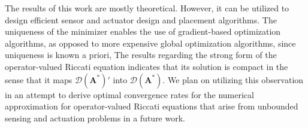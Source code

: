 \documentclass{amsart}
\newcommand{\bA}{\mathbf A}
\begin{document}
The results of this work are mostly theoretical. However, it can be utilized to design efficient sensor and actuator design and placement algorithms. The uniqueness of the minimizer enables the use of gradient-based optimization algorithms, as opposed to more expensive global optimization algorithms, since uniqueness is known a priori, The results regarding the strong form of the operator-valued Riccati equation indicates that its solution is compact in the sense that it maps $\mathcal D(\bA^*)'$ into $\mathcal D(\bA^*)$. We plan on utilizing this observation in an attempt to derive optimal convergence rates for the numerical approximation for operator-valued Riccati equations that arise from unbounded sensing and actuation problems in a future work. 



\end{document}
